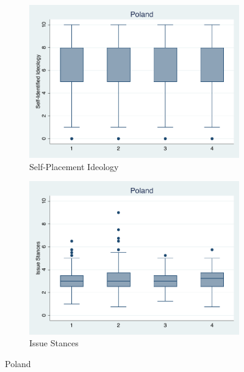 \documentclass[12pt, titlepage]{article}
\begin{document}
\begin{figure}[H]
	\centering
	\begin{subfigure}[b]{0.475\textwidth}   
		\centering 
		\includegraphics[width=\textwidth]{IdeoBP/Poland}
		\caption{Self-Placement Ideology}
	\end{subfigure}
	\hfill
	\begin{subfigure}[b]{0.475\textwidth}
		\centering 
		\includegraphics[width=\textwidth]{BoxLib/Poland}
		\caption{Issue Stances}
	\end{subfigure}
	\caption{Poland}
	\label{Poland}
\end{figure}
\end{document}
